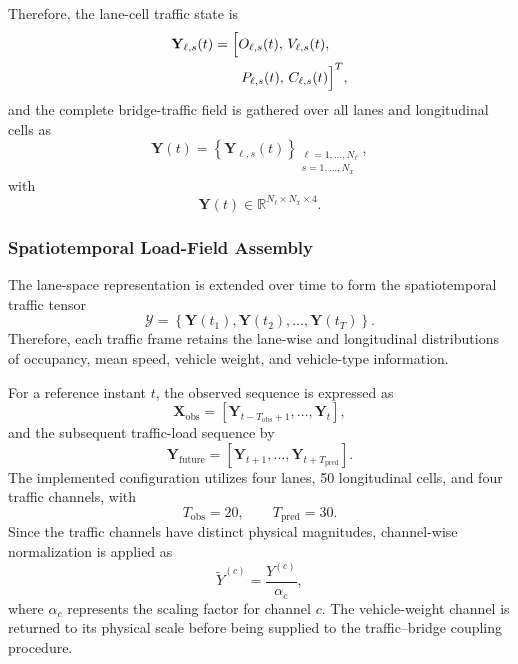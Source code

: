 \documentclass[journal]{IEEEtran}
\newcommand{\mathbfcal}[1]{\boldsymbol{\mathcal{#1}}}
\begin{document}
Therefore, the lane-cell traffic state is
\begin{equation}
\begin{aligned}
\mathbf{Y}_{\ell,s}(t)&=\Bigl[O_{\ell,s}(t),\,V_{\ell,s}(t),\\
&\qquad P_{\ell,s}(t),\,C_{\ell,s}(t)\Bigr]^{T},
\end{aligned}
\label{eq:lane_cell_state}
\end{equation}
and the complete bridge-traffic field is gathered over all lanes and longitudinal cells as
\begin{equation}
\mathbf{Y}(t)=\left\{\mathbf{Y}_{\ell,s}(t)\right\}_{\substack{\ell=1,\ldots,N_{\ell}\\s=1,\ldots,N_x}},
\label{eq:traffic_field}
\end{equation}
with
\begin{equation}
\mathbf{Y}(t)\in\mathbb{R}^{N_{\ell}\times N_x\times 4}.
\label{eq:traffic_field_dimension}
\end{equation}

\subsubsection{Spatiotemporal Load-Field Assembly}
\label{subsec:spatiotemporal_field}

The lane-space representation is extended over time to form the spatiotemporal traffic tensor
\begin{equation}
\mathbfcal{Y}=\left\{\mathbf{Y}(t_1),\mathbf{Y}(t_2),\ldots,\mathbf{Y}(t_T)\right\}.
\label{eq:spatiotemporal_tensor}
\end{equation}
Therefore, each traffic frame retains the lane-wise and longitudinal distributions of occupancy, mean speed, vehicle weight, and vehicle-type information.

For a reference instant $t$, the observed sequence is expressed as
\begin{equation}
\mathbf{X}_{\mathrm{obs}}=\left[\mathbf{Y}_{t-T_{\mathrm{obs}}+1},\ldots,\mathbf{Y}_{t}\right],
\label{eq:observed_sequence}
\end{equation}
and the subsequent traffic-load sequence by
\begin{equation}
\mathbf{Y}_{\mathrm{future}}=\left[\mathbf{Y}_{t+1},\ldots,\mathbf{Y}_{t+T_{\mathrm{pred}}}\right].
\label{eq:future_sequence}
\end{equation}
The implemented configuration utilizes four lanes, 50 longitudinal cells, and four traffic channels, with
\begin{equation}
T_{\mathrm{obs}}=20,\qquad T_{\mathrm{pred}}=30.
\label{eq:sequence_lengths}
\end{equation}
Since the traffic channels have distinct physical magnitudes, channel-wise normalization is applied as
\begin{equation}
\widetilde{Y}^{(c)}=\frac{Y^{(c)}}{\alpha_c},
\label{eq:channel_normalization}
\end{equation}
where $\alpha_c$ represents the scaling factor for channel $c$. The vehicle-weight channel is returned to its physical scale before being supplied to the traffic--bridge coupling procedure.
\end{document}
